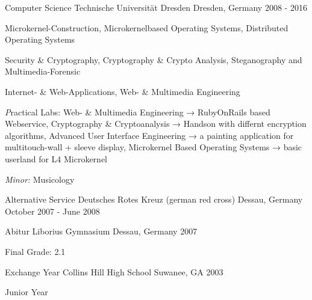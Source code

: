\begin{cventries}
  \cventry
    {Computer Science}
    {Technische Universität Dresden}
    {Dresden, Germany}
    {2008 - 2016}
    {
      \begin{cvitems}
      \item {
          Microkernel-Construction,
          Microkernelbased Operating Systems,
          Distributed Operating Systems
        }
      \item {
          Security \& Cryptography,
          Cryptography \& Crypto Analysis,
          Steganography and Multimedia-Forensic
        }
      \item {
          Internet- \& Web-Applications, Web- \& Multimedia Engineering
        }
      \item {
          {\textit Practical Labs:}\newline
          Web- \& Multimedia Engineering → RubyOnRails based Webservice, \newline
          Cryptography \& Cryptoanalysis → Handson with differnt encryption algorithms, \newline
          Advanced User Interface Engineering → a painting application for multitouch-wall + sleeve display, \newline
          Microkernel Based Operating Systems → basic userland for L4 Microkernel \newline
        }
      \item {\textit{Minor:} Musicology}
      \end{cvitems}
    }

  \cventry
    {Alternative Service}
    {Deutsches Rotes Kreuz (german red cross)}
    {Dessau, Germany}
    {October 2007 - June 2008}
    {
    }

  \cventry
    {Abitur}
    {Liborius Gymnasium}
    {Dessau, Germany}
    {2007}
    {
      \begin{cvitems}
      \item[] {Final Grade: 2.1}
      \end{cvitems}
    }
  \cventry
    {Exchange Year}
    {Collins Hill High School}
    {Suwanee, GA}
    {2003}
    {
      \begin{cvitems}
      \item[] {Junior Year}
      \end{cvitems}
    }
\end{cventries}
